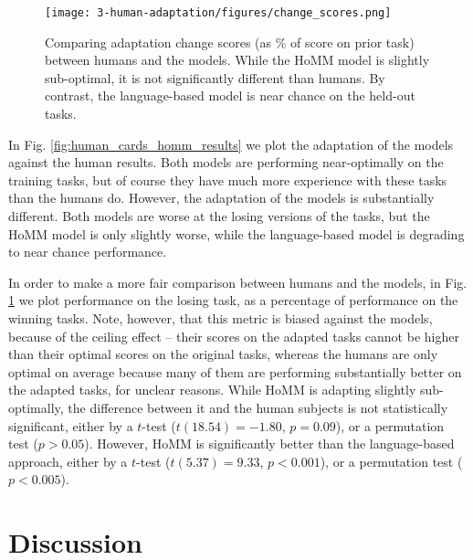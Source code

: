 \begin{figure}
\centering
\texttt{[image: 3-human-adaptation/figures/change\_scores.png]}
\caption[Comparing adaptation change scores between the humans and models.]{Comparing adaptation change scores (as \% of score on prior task) between humans and the models. While the HoMM model is slightly sub-optimal, it is not significantly different than humans. By contrast, the language-based model is near chance on the held-out tasks.} \label{fig:human_cards_homm_change_scores}
\end{figure}
In Fig. \ref{fig:human_cards_homm_results} we plot the adaptation of the models against the human results. Both models are performing near-optimally on the training tasks, but of course they have much more experience with these tasks than the humans do. However, the adaptation of the models is substantially different. Both models are worse at the losing versions of the tasks, but the HoMM model is only slightly worse, while the language-based model is degrading to near chance performance. \par
In order to make a more fair comparison between humans and the models, in Fig. \ref{fig:human_cards_homm_change_scores} we plot performance on the losing task, as a percentage of performance on the winning tasks. Note, however, that this metric is biased against the models, because of the ceiling effect -- their scores on the adapted tasks cannot be higher than their optimal scores on the original tasks, whereas the humans are only optimal on average because many of them are performing substantially better on the adapted tasks, for unclear reasons. While HoMM is adapting slightly sub-optimally, the difference between it and the human subjects is not statistically significant, either by a \(t\)-test (\(t(18.54) = -1.80\), \(p = 0.09\)), or a permutation test (\(p > 0.05\)). However, HoMM is significantly better than the language-based approach, either by a   \(t\)-test (\(t(5.37) = 9.33\), \(p < 0.001\)), or a permutation test (\(p < 0.005\)). \par

\section{Discussion}

